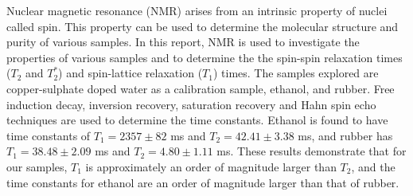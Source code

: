 Nuclear magnetic resonance (NMR) arises from an intrinsic property of nuclei called spin. This property can be used to determine the molecular structure and purity of various samples. In this report, NMR is used to investigate the properties of various samples and to determine the the spin-spin relaxation times ($T_2$ and $T_{2}^*$) and spin-lattice relaxation ($T_1$) times. The samples explored are copper-sulphate doped water as a calibration sample, ethanol, and rubber. Free induction decay, inversion recovery, saturation recovery  and Hahn spin echo techniques are used to determine the time constants. Ethanol is found to have time constants of $T_1 = 2357\pm 82$ ms and $T_2=42.41\pm 3.38$ ms, and rubber has $T_1 = 38.48\pm 2.09$ ms and $T_2 = 4.80\pm1.11$ ms. These results demonstrate that for our samples, $T_1$ is approximately an order of magnitude larger than $T_2$, and the time constants for ethanol are an order of magnitude larger than that of rubber. 